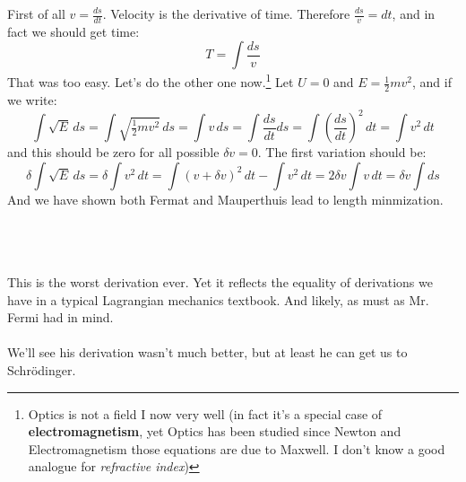 \documentclass[12pt]{article}
\begin{document}
\newpage

\noindent First of all $v = \frac{ds}{dt}$.  Velocity is the derivative of time.  Therefore $\frac{ds}{v} = dt $, and in fact we should get time:
$$ T = \int \frac{ds}{v} $$
That was too easy.  Let's do the other one now.\footnote{Optics is not a field I now very well (in fact it's a special case of \textbf{electromagnetism}, yet Optics has been studied since Newton and Electromagnetism those equations are due to Maxwell.  I don't know a good analogue for \textit{refractive index})}  Let $U=0$ and $E = \frac{1}{2} m v^2$, and if we write:
$$  \int \sqrt{E} \, ds = \int \sqrt{\tfrac{1}{2}mv^2} \, ds =  \int v \, ds =
\int \frac{ds}{dt} ds = \int \left(\frac{ds}{dt}\right)^2 \, dt  = \int v^2 \, dt $$
and this should be zero for all possible $\delta v = 0$.  The first variation should be:
$$ \delta \int \sqrt{E} \, ds = \delta \int v^2 \, dt
= \int (v + \delta v)^2 \, dt - \int v^2 \, dt  = 2 \delta v \int v \, dt = \delta v \int ds  $$
And we have shown both Fermat and Mauperthuis lead to length minmization.  \\ \\
 \\ \\
This is the worst derivation ever.  Yet it reflects the equality of derivations we have in a typical Lagrangian mechanics textbook.  And likely, as must as Mr. Fermi had in mind.  \\ \\
We'll see his derivation wasn't much better, but at least he can get us to Schr\"{o}dinger.

\newpage
\end{document}
